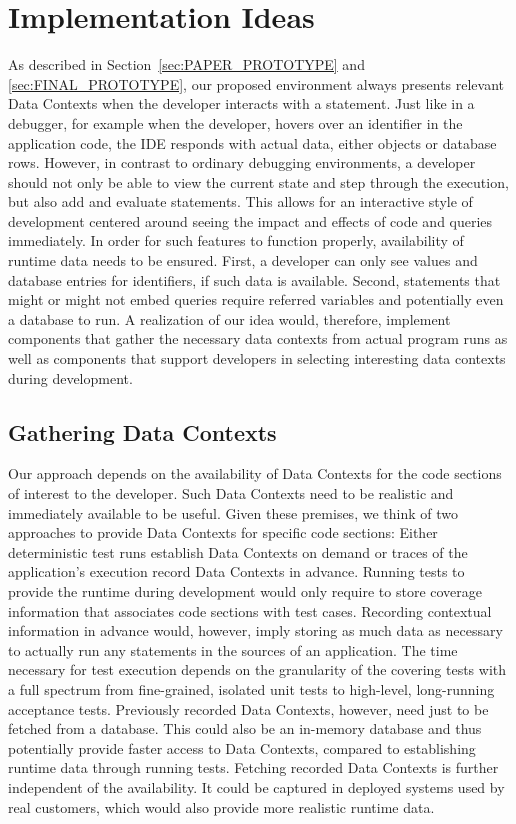 \section[Implementation Ideas (Author: Lauritz Thamsen)]{Implementation Ideas} \label{sec:IMPLEMENTATION_IDEAS}
As described in Section~\ref{sec:PAPER_PROTOTYPE} and \ref{sec:FINAL_PROTOTYPE}, our proposed environment always presents relevant Data Contexts when the developer interacts with a statement.
Just like in a debugger, for example when the developer, hovers over an identifier in the application code, the IDE responds with actual data, either objects or database rows.
However, in contrast to ordinary debugging environments, a developer should not only be able to view the current state and step through the execution, but also add and evaluate statements.
This allows for an interactive style of development centered around seeing the impact and effects of code and queries immediately.
In order for such features to function properly, availability of runtime data needs to be ensured.
First, a developer can only see values and database entries for identifiers, if such data is available.
Second, statements that might or might not embed queries require referred variables and potentially even a database to run.
A realization of our idea would, therefore, implement components that gather the necessary data contexts from actual program runs as well as components that support developers in selecting interesting data contexts during development.

\subsection{Gathering Data Contexts}

Our approach depends on the availability of Data Contexts for the code sections of interest to the developer.
Such Data Contexts need to be realistic and immediately available to be useful.
Given these premises, we think of two approaches to provide Data Contexts for specific code sections:
Either deterministic test runs establish Data Contexts on demand or traces of the application's execution record Data Contexts in advance.
Running tests to provide the runtime during development would only require to store coverage information that associates code sections with test cases. Recording contextual information in advance would, however, imply storing as much data as necessary to actually run any statements in the sources of an application.
The time necessary for test execution depends on the granularity of the covering tests with a full spectrum from fine-grained, isolated unit tests to high-level, long-running acceptance tests.
Previously recorded Data Contexts, however, need just to be fetched from a database. This could also be an in-memory database and thus potentially provide faster access to Data Contexts, compared to establishing runtime data through running tests.
Fetching recorded Data Contexts is further independent of the availability.
It could be captured in deployed systems used by real customers, which would also provide more realistic runtime data.

